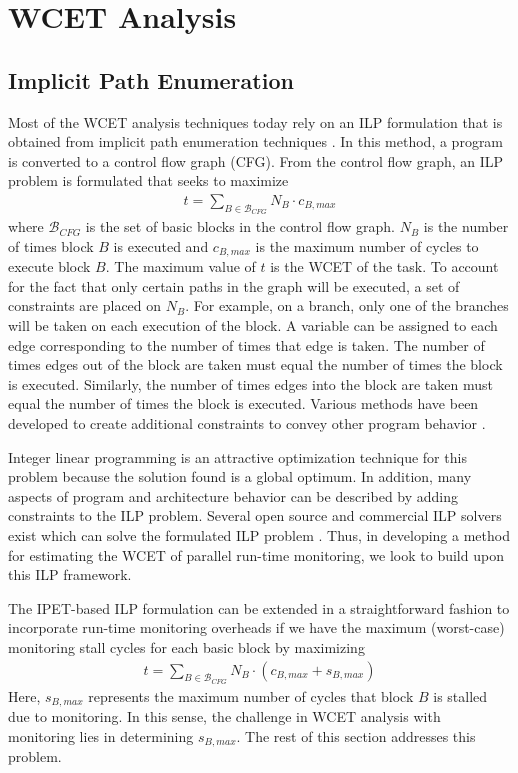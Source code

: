 \section{WCET Analysis}
\label{sec:monitoring_wcet.wcet}

\subsection{Implicit Path Enumeration}
\label{sec:monitoring_wcet.wcet.ipet}

Most of the WCET analysis techniques today rely on an ILP formulation that is
obtained from implicit path enumeration techniques \cite{li-ipet-dac95}.  In
this method, a program is converted to a control flow graph (CFG). From the
control flow graph, an ILP problem is formulated that seeks to maximize
\begin{align*}
  t = \sum_{B \in \mathcal{B}_{CFG}}{N_B \cdot c_{B,max}}
\end{align*} 
where $\mathcal{B}_{CFG}$ is the set of basic blocks in the control flow graph.
$N_{B}$ is the number of times block $B$ is executed and $c_{B,max}$ is the
maximum number of cycles to execute block $B$. The maximum value of $t$ is the
WCET of the task.  To account for the fact that only certain paths in the graph
will be executed, a set of constraints are placed on $N_{B}$. For example, on a
branch, only one of the branches will be taken on each execution of the block.
A variable can be assigned to each edge corresponding to the number of times
that edge is taken.  The number of times edges out of the block are taken must
equal the number of times the block is executed.  Similarly, the number of
times edges into the block are taken must equal the number of times the block
is executed. Various methods have been developed to create additional
constraints to convey other program behavior \cite{li-ipet-dac95,
wcetsurvey-tecs08}.

Integer linear programming is an attractive optimization technique for this
problem because the solution found is a global optimum. In addition, many
aspects of program and architecture behavior can be described by adding
constraints to the ILP problem.  Several open source and commercial ILP solvers
exist which can solve the formulated ILP problem \cite{lpsolve, cplex}.  Thus,
in developing a method for estimating the WCET of parallel run-time monitoring,
we look to build upon this ILP framework.

The IPET-based ILP formulation can be extended in a straightforward fashion to
incorporate run-time monitoring overheads if we have the maximum (worst-case)
monitoring stall cycles for each basic block by maximizing
\begin{align*}
  t = \sum_{B \in \mathcal{B}_{CFG}}{N_{B} \cdot (c_{B,max} + s_{B,max})}
\end{align*}
Here, $s_{B,max}$ represents the maximum number of cycles that block $B$ is
stalled due to monitoring. In this sense, the challenge in WCET analysis with
monitoring lies in determining $s_{B,max}$.  The rest of this section addresses
this problem.

